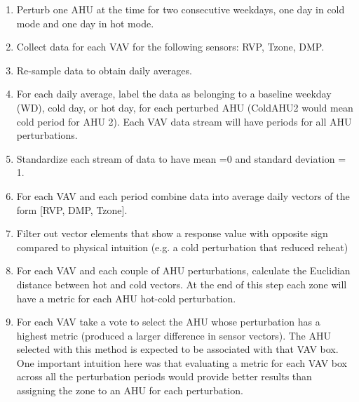 \begin{enumerate}
\item Perturb one AHU at the time for two consecutive weekdays, one day in cold mode and one day in hot mode. 
\item Collect data for each VAV for the following sensors: RVP, Tzone, DMP. 
\item Re-sample data to obtain daily averages.
\item For each daily average, label the data as belonging to a baseline weekday (WD), cold day, or hot day, for each perturbed AHU (ColdAHU2 would mean cold period for AHU 2). Each VAV data stream will have periods for all AHU perturbations.
\item Standardize each stream of data to have mean =0 and standard deviation = 1.
\item For each VAV and each period combine data into average daily vectors of the form [RVP, DMP, Tzone].
\item Filter out vector elements that show a response value with opposite sign compared to physical intuition (e.g. a cold perturbation that reduced reheat)
\item For each VAV and each couple of AHU perturbations, calculate the Euclidian distance between hot and cold vectors. At the end of this step each zone will have a metric for each AHU hot-cold perturbation.
\item For each VAV take a vote to select the AHU whose perturbation has a highest metric (produced a larger difference in sensor vectors). The AHU selected with this method is expected to be associated with that VAV box.
One important intuition here was that evaluating a metric for each VAV box across all the perturbation periods would provide better results than assigning the zone to an AHU for each perturbation. 
\end{enumerate}

